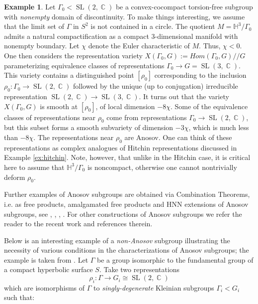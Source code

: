 \documentclass[12pt]{amsbook}%
\theoremstyle{definition}
\newtheorem{example}[thm]{Example}
\theoremstyle{remark}
\numberwithin{section}{chapter}
\numberwithin{subsection}{section}
\numberwithin{figure}{chapter}
\DeclareMathOperator{\C}{\mathbb{C}}
\DeclareMathOperator{\SL}{SL}
\def\bH{{\mathbb{H}}}
\def\Ga{\Gamma}
\begin{document}
{{\begin{example}
Let $\Ga_0< \SL(2,\C)$ be a convex-cocompact torsion-free subgroup with {\em nonempty} domain of discontinuity. To make things interesting, we assume that the limit set of $\Ga$ in $S^2$ is not contained in a circle. The quotient 
$M=\bH^3/\Ga_0$ admits a natural compactification as a compact 3-dimensional manifold with nonempty boundary. Let $\chi$ denote the Euler characteristic of $M$. Thus, $\chi<0$. One then considers the representation variety 
$X(\Ga_0,G):=Hom(\Ga_0, G)//G$ parameterizing equivalence classes of representations $\Ga_0\to G=\SL(3,\C)$. This variety contains a distinguished point $[\rho_0]$ corresponding to the inclusion $\rho_0: \Ga_0\to \SL(2,\C)$ followed by the unique (up to conjugation) irreducible representation $\SL(2,\C)\to \SL(3,\C)$. It turns out that the variety $X(\Ga_0,G)$ is smooth at $[\rho_0]$, of local dimension $-8\chi$. Some of the equivalence classes of representations near $\rho_0$ come from representations $\Ga_0\to \SL(2,\C)$, but this subset forms a smooth subvariety of dimension $-3\chi$, which is much less than $-8\chi$. The representations near $\rho_0$  are Anosov. One can think of these representations as complex analogues of Hitchin representations discussed in Example \ref{ex:hitchin}. Note, however, that unlike in the Hitchin case, it is critical here to assume that $\bH^3/\Ga_0$ is noncompact, otherwise one cannot nontrivially deform $\rho_0$. 
\end{example}




\medskip 
Further examples of Anosov subgroups are obtained via Combination Theorems, i.e. as free products, amalgamated free products and HNN extensions of Anosov subgroups, see \cite{KLP14}, \cite{Dey-Kapovich-Leeb}, \cite{Dey-Kapovich1}, \cite{Dey-Kapovich2}. For 
other constructions of Anosov subgroups we refer the reader to the recent work \cite{DFWZ} and references therein. 

Below is an interesting example of a {\em non-Anosov} subgroup illustrating the necessity of various conditions in the characterizations of Anosov subgroups; the example is taken from \cite[\S 8.11]{Kapovich-Sardar}. 
Let $\Ga$ be a group isomorphic to the fundamental group of a compact hyperbolic surface $S$. Take two representations
$$
\rho_i: \Ga\to G_i\cong \SL(2,\C)
$$
which are isomorphisms of $\Ga$ to {\em singly-degenerate} Kleinian subgroups $\Ga_i< G_i$ such that:

}}
\end{document}
